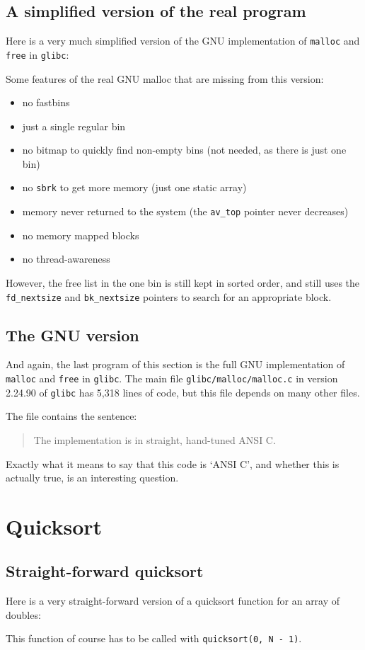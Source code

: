 \documentclass{article}
\begin{document}
\subsection{A simplified version of the real program}
Here is a very much simplified version of the GNU implementation of \texttt{malloc} and \texttt{free} in \texttt{glibc}:

Some features of the real GNU malloc that are missing from this version:
\begin{itemize}
\item no fastbins
\item just a single regular bin
\item no bitmap to quickly find non-empty bins (not needed, as there is just one bin)
\item no \texttt{sbrk} to get more memory (just one static array)
\item memory never returned to the system (the \lstinline|av_top| pointer never decreases)
\item no memory mapped blocks
\item no thread-awareness
\end{itemize}
However, the free list in the one bin is still kept in sorted order, and still uses
the \lstinline|fd_nextsize| and \lstinline|bk_nextsize| pointers to search
for an appropriate block.

\subsection{The GNU version}
And again, the last program of this section is the full GNU implementation of \texttt{malloc} and \texttt{free} in \texttt{glibc}.
The main file \lstinline|glibc/malloc/malloc.c| in version 2.24.90 of \texttt{glibc} has 5,318 lines of code, but this file depends on many other files.

The file contains the sentence:
\begin{quote}
The implementation is in straight, hand-tuned ANSI C.
\end{quote}
Exactly what it means to say that this code is `ANSI C', and whether this is actually true, is an interesting question.
\addtocounter{lstlisting}{1}

\section{Quicksort}
\subsection{Straight-forward quicksort}\label{qsort1}
Here is a very straight-forward version of a quicksort function for
an array of doubles:

This function of course has to be called with \lstinline|quicksort(0, N - 1)|.
\end{document}

